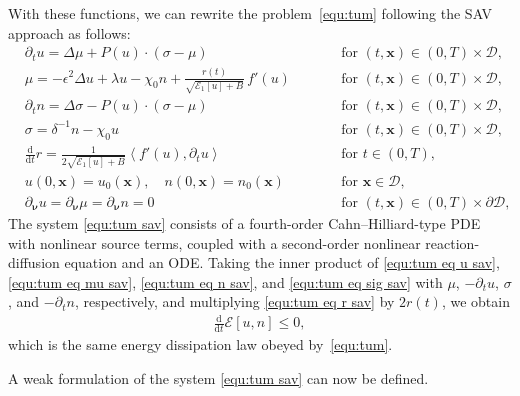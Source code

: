 \documentclass[11pt, reqno]{amsart}
\theoremstyle{definition}
\numberwithin{equation}{section}
\newcommand{\bff}{\boldsymbol}
\newcommand{\ddt}{\frac{\mathrm{d}}{\mathrm{d}t}}
\newcommand{\inpro}[2]{\left\langle#1,#2\right\rangle}
\begin{document}
With these functions, we can rewrite the problem~\eqref{equ:tum} following the SAV approach as follows:
\begin{subequations}\label{equ:tum sav}
	\begin{alignat}{2}
		\label{equ:tum eq u sav}
		&\partial_t u
		=
		\Delta \mu + P(u)\cdot (\sigma-\mu)
		\qquad && \text{for $(t,\bff{x})\in(0,T)\times\mathscr{D}$,}
		\\
		\label{equ:tum eq mu sav}
		&\mu = -\epsilon^2 \Delta u + \lambda u - \chi_0 n + \frac{r(t)}{\sqrt{\mathcal{E}_1[u]+B}}\, f'(u)
		\qquad && \text{for $(t,\bff{x})\in(0,T)\times\mathscr{D}$,}
		\\
		\label{equ:tum eq n sav}
		&\partial_t n = \Delta \sigma - P(u)\cdot (\sigma-\mu)
		\qquad && \text{for $(t,\bff{x})\in(0,T)\times\mathscr{D}$,}
		\\
		\label{equ:tum eq sig sav}
		&\sigma = \delta^{-1} n- \chi_0 u
		\qquad && \text{for $(t,\bff{x})\in(0,T)\times\mathscr{D}$,}
		\\
		\label{equ:tum eq r sav}
		&{\ddt r} = \frac{1}{2\sqrt{\mathcal{E}_1[u]+B}} \inpro{f'(u)}{\partial_t u}
		\qquad && \text{for {$t\in(0,T)$},}
		\\
		\label{equ:tum init sav}
		&u(0,\bff{x})= u_0(\bff{x}),\quad n(0,\bff{x})= n_0(\bff{x})
		\qquad && \text{for } \bff{x}\in \mathscr{D},
		\\
		\label{equ:tum bound sav}
		&\partial_{\bff{\nu}} u= \partial_{\bff{\nu}} \mu = \partial_{\bff{\nu}} n = 0
		\qquad && \text{for } (t,\bff{x})\in (0,T) \times \partial \mathscr{D},
	\end{alignat}
\end{subequations}
The system \eqref{equ:tum sav} consists of a fourth-order Cahn--Hilliard-type PDE with nonlinear source terms, coupled with a second-order nonlinear reaction-diffusion equation and an ODE.
Taking the inner product of \eqref{equ:tum eq u sav}, \eqref{equ:tum eq mu sav}, \eqref{equ:tum eq n sav}, and \eqref{equ:tum eq sig sav} with $\mu$, $-\partial_t u$, $\sigma$, and $-\partial_t n$, respectively, and multiplying \eqref{equ:tum eq r sav} by $2r(t)$, we obtain
\begin{align}\label{equ:ene law sav form}
	\ddt \mathcal{E}[u,n] \leq 0,	
\end{align}
which is the same energy dissipation law obeyed by~\eqref{equ:tum}.

A weak formulation of the system \eqref{equ:tum sav} can now be defined.
\end{document}
